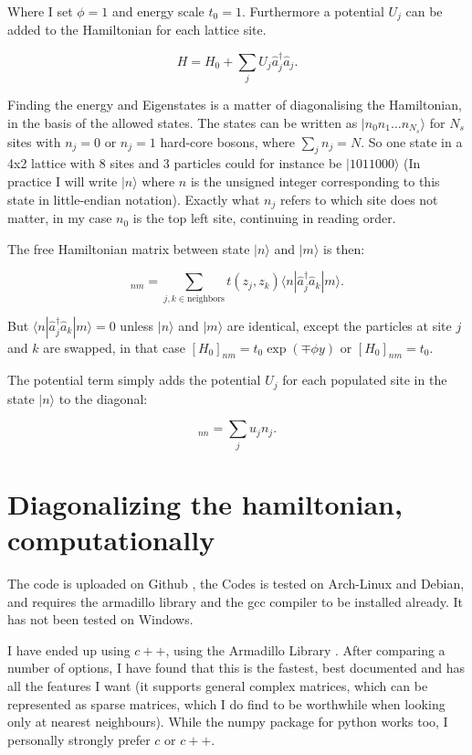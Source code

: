 \documentclass[a4paper,12pt,article]{memoir}
\begin{document}
Where I set $\phi=1$ and energy scale $t_0=1$. Furthermore a potential $U_j$ can be added to the Hamiltonian for each lattice site.

\begin{equation}
H=H_0+\sum_j U_j \hat{a}_j^\dagger\hat{a}_j.
\end{equation}

Finding the energy and Eigenstates is a matter of diagonalising the Hamiltonian, in the basis of the allowed states. The states can be written as $|n_0n_1\ldots n_{N_{s}} \rangle$ for $N_{s}$ sites with $n_j=0$ or $n_j=1$ hard-core bosons, where $\sum_j n_j=N$. So one state in a 4x2 lattice with 8 sites and 3 particles could for instance be $|1011000\rangle$ (In practice I will write $|n\rangle$ where $n$ is the unsigned integer corresponding to this state in little-endian notation). Exactly what $n_j$ refers to which site does not matter, in my case $n_0$ is the top left site, continuing in reading order.

The free Hamiltonian matrix between state $|n\rangle$ and $|m\rangle$ is then:

\begin{equation}
[H_0]_{nm}=\sum_{j,k\in\mathrm{neighbors}}  t(z_j,z_k) \langle n| \hat{a}_j^\dagger\hat{a}_k|m\rangle .
\end{equation}

But $ \langle n| \hat{a}_j^\dagger\hat{a}_k|m\rangle =0$ unless $|n\rangle$ and  $|m\rangle$ are identical, except the particles at site $j$ and $k$ are swapped, in that case $[H_0]_{nm}=t_0\exp(\mp \phi y)$ or $[H_0]_{nm}=t_0$.

The potential term simply adds the potential $U_j$ for each populated site in the state $|n\rangle$ to the diagonal:

\begin{equation}
[U]_{nn}=\sum_{j} u_j n_j.
\end{equation}

\section{Diagonalizing the hamiltonian, computationally}
The code is uploaded on Github \cite{code}, the Codes is tested on Arch-Linux and Debian, and requires the armadillo library and the gcc compiler to be installed already. It has not been tested on Windows.

I have ended up using $c++$, using the Armadillo Library \cite{arma}. After comparing a number of options, I have found that this is the fastest, best documented and has all the features I want (it supports general complex matrices, which can be represented as sparse matrices, which I do find to be worthwhile when  looking only at nearest neighbours). While the numpy package for python works too, I personally strongly prefer $c$ or $c++$.
\end{document}
